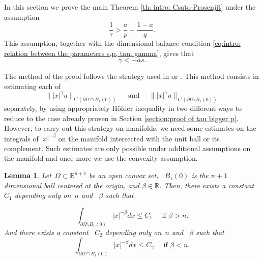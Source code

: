 \documentclass[reqno,12pt]{amsart}
\newcommand{\R}{\mathbb{R}}
\newcommand{\delomega}{\partial\Omega}
\numberwithin{equation}{section}
\theoremstyle{plain}
\newtheorem{lemma}[definition]{Lemma}
\theoremstyle{definition}
\renewcommand{\leq}{\leqslant}
\begin{document}
In this section we prove the main Theorem \ref{th: intro: Csato-Prosenjit} under the assumption
\begin{equation}
 \label{eq:assumption case 2}
  \frac{1}{\tau}> \frac{a}{p}+\frac{1-a}{q}.
\end{equation}
This assumption, together with the dimensional balance condition \eqref{eq:intro: relation between the parameters s,p, tau, gamma}, gives that
\begin{equation}
    \label{eq:sec4: gamma negative}
    \gamma < -as. 
\end{equation}


The method of the proof follows the strategy used in \cite[Section (V)]{CKN} or \cite{Squassina2018}. This method consists in estimating each of 
$$
  \||x|^{\gamma}u\|_{L^{\tau}(\partial\Omega\cap B_1(0))}\quad\text{ and }\quad
  \||x|^{\gamma}u\|_{L^{\tau}(\partial\Omega\setminus B_1(0))}
$$
separately, by using appropriately H\"older inequality in two different ways to reduce to the case already proven in Section \ref{section:proof of tau bigger p}. However, to carry out this strategy on manifolds, we need some estimates on the integrals of $|x|^{-\beta}$ on the manifold intersected with the unit ball or its complement. Such estimates are only possible under additional assumptions on the manifold and once more we use the convexity assumption. 



\begin{lemma}
    \label{lemma:weighted integrals on M}
     Let~$\Omega\subset\R^{n+1}$ be an open convex set, ~$B_1(0)$ is the $n+1$ dimensional ball centered at the origin, and $\beta\in\R$. Then, there exists a  constant~$C_1$ depending only on~$n$ and ~$\beta$  such that 

     \begin{equation}
         \label{eq:ball complement}
\int_{\delomega\setminus B_1(0)}|x|^{-\beta}dx \leq C_1\quad\text{ if }\beta>n.
     \end{equation}
And there exists a  constant ~$C_2$ depending only on~$n$ and ~$\beta$  such that
          \begin{equation}
         \label{eq:bound in ball}
\int_{\delomega\cap B_1(0)}|x|^{-\beta}dx \leq C_2\quad\text{ if }\beta<n.
     \end{equation}
\end{lemma}
\end{document}
